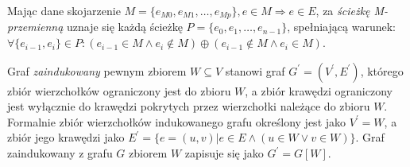 \begin{definition}
  Mając dane skojarzenie ${M=\{e_{M0}, e_{M1}, \ldots, e_{Mp}\}, e \in M \Rightarrow e \in E}$,
  za \emph{ścieżkę M-przemienną} uznaje się każdą ścieżkę $P=\{e_0, e_1, \ldots,
  e_{n-1}\}$, spełniającą warunek: 
  ${\forall{\{e_{i-1}, e_i\} \in P}: (e_{i-1} \in M \land e_{i} \notin M) \oplus
  (e_{i-1} \notin M \land e_{i} \in M)}$.
\end{definition}

\begin{definition}
  Graf \emph{zaindukowany} pewnym zbiorem $W \subseteq V$ stanowi graf $G^\prime=(V^\prime, E^\prime)$, którego zbiór wierzchołków ograniczony jest do zbioru $W$, a zbiór krawędzi ograniczony jest wyłącznie do krawędzi pokrytych przez wierzchołki należące do zbioru $W$.
  Formalnie zbiór wierzchołków indukowanego grafu określony jest jako $V^\prime = W$, a zbiór jego krawędzi jako $E^\prime=\{e=(u,v)|e\in E \land (u \in W \lor v \in W)\}$.
  Graf zaindukowany z grafu $G$ zbiorem $W$ zapisuje się jako $G^\prime = G[W]$.
\end{definition}
